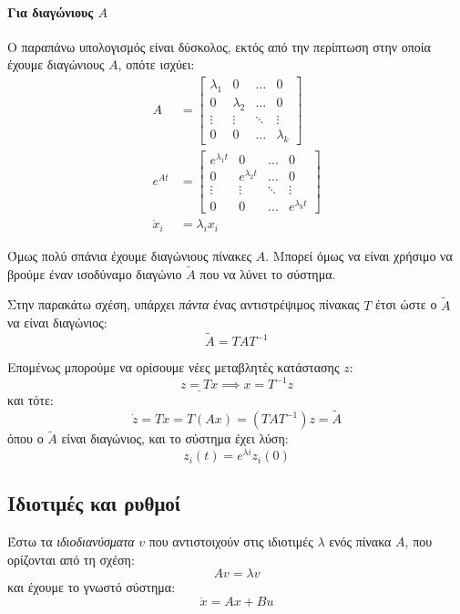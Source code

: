 \documentclass[11pt,a4paper,notitlepage,fleqn]{article}
\begin{document}
\paragraph{Για διαγώνιους \(A\)}
Ο παραπάνω υπολογισμός είναι δύσκολος, εκτός από την περίπτωση στην οποία έχουμε διαγώνιους \( A \), οπότε ισχύει:
\begin{align*}
	A &= \left[\begin{matrix}
	\lambda_1 & 0 & \hdots & 0 \\
	0 & \lambda_2 & \hdots & 0 \\
	\vdots & \vdots & \ddots & \vdots \\
	0 & 0 & \hdots & \lambda_k
	\end{matrix}\right] \\
	e^{At} &= \left[\begin{matrix}
	e^{\lambda_1t} & 0 & \hdots & 0 \\
	0 & e^{\lambda_2t} & \hdots & 0 \\
	\vdots & \vdots & \ddots & \vdots \\
	0 & 0 & \hdots & e^{\lambda_kt}
	\end{matrix}\right]\\
	\dot x_i &= \lambda_i x_i
\end{align*}

Όμως πολύ σπάνια έχουμε διαγώνιους πίνακες \( A \). Μπορεί όμως να είναι χρήσιμο να βρούμε έναν ισοδύναμο διαγώνιο \( \tilde A \)
που να λύνει το σύστημα.

Στην παρακάτω σχέση, υπάρχει \textit{πάντα} ένας αντιστρέψιμος πίνακας \( T \) έτσι ώστε ο \( \tilde A \) να είναι διαγώνιος:
\[
\tilde A = TAT^{-1}
\]

Επομένως μπορούμε να ορίσουμε νέες μεταβλητές κατάστασης \( z \):
\[
\underline{z = Tx} \implies x = T^{-1}z
\]
και τότε:
\[
\dot z = T\dot x = T(Ax) = \left(TAT^{-1}\right)z = \tilde A
\]
όπου ο \( \tilde A \) είναι διαγώνιος, και το σύστημα έχει λύση:
\[
z_i(t) = e^{\lambda i} z_i (0)
\]


\subsection{Ιδιοτιμές και ρυθμοί}
Έστω τα \textit{ιδιοδιανύσματα} \( v \) που αντιστοιχούν στις
ιδιοτιμές \( λ \) ενός πίνακα \( A \), που ορίζονται από τη σχέση:
\[
Av = λv
\]
και έχουμε το γνωστό σύστημα:
\[
\dot x = Ax + Bu
\]
\end{document}

